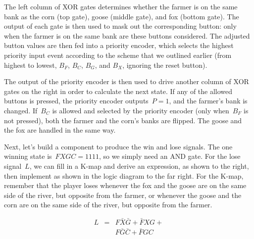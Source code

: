 \centerline{}\vspace{12pt}

The left column of XOR gates determines whether the farmer is on the same
bank as the corn (top gate), goose (middle gate), and fox (bottom gate).
The output of each gate is then used to mask out the corresponding button:
only when the farmer is on the same bank are these buttons considered.
The adjusted button values are then fed into a priority encoder, which
selects the highest priority input event according to the scheme that
we outlined earlier (from highest to lowest, $B_F$, $B_C$, $B_G$, and
$B_X$, ignoring the reset button).  

The output of the priority encoder is then used to drive another column
of XOR gates on the right in order to calculate the next state.
If any of the allowed buttons is pressed, the priority encoder 
outputs~$P=1$, and the farmer's bank is changed.  If~$B_C$ is allowed
and selected by the priority encoder (only when~$B_F$ is not pressed),
both the farmer and the corn's banks are flipped.  The goose and the fox
are handled in the same way.

\begin{minipage}{1.60in}
Next, let's build a component to produce the win and lose signals.
The one winning state is~$FXGC=1111$, so we simply need an AND gate.
For the lose signal~$L$, we can fill in a \mbox{K-map} and derive an 
expression, as shown to the right, then implement as shown in the logic
diagram to the far right.  For the \mbox{K-map}, remember that the player
loses whenever the fox and the goose are on the same side of the river,
but opposite from the farmer, or whenever the goose and the corn are on
the same side of the river, but opposite from the farmer.
\end{minipage}\hspace{0.25in}%
\begin{minipage}{1.50in}
\centerline{}
\begin{eqnarray*}
L &=& F \bar{X} \bar{G} + \bar{F} X G +\\
&& F \bar{G} \bar{C} + \bar{F} G C
\end{eqnarray*}
\end{minipage}\hspace{0.25in}%
\begin{minipage}{2.90in}
\end{minipage}

